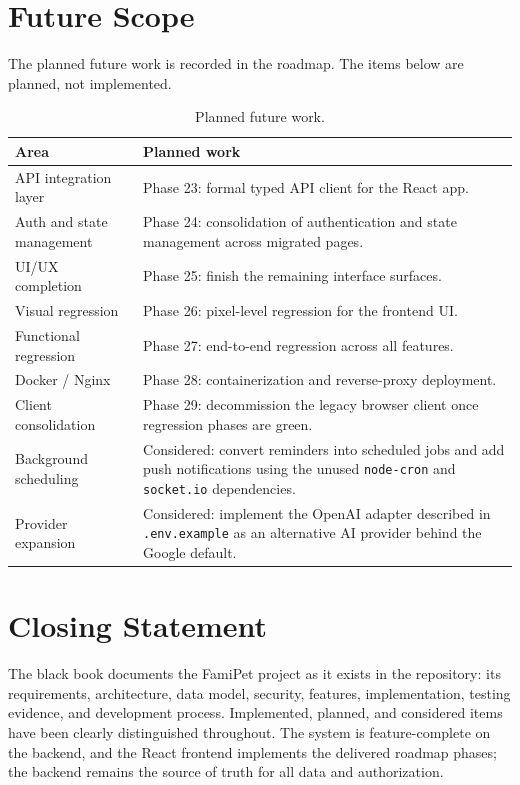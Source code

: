\section{Future Scope}

The planned future work is recorded in the roadmap. The items below are planned,
not implemented.

\begin{center}
\begin{longtable}{@{}p{5.2cm}p{9.4cm}@{}}
\caption{Planned future work.}
\label{tab:planned}\\
\toprule
\textbf{Area} & \textbf{Planned work} \\
\midrule
API integration layer & Phase 23: formal typed API client for the React app. \\
Auth and state management & Phase 24: consolidation of authentication and state
management across migrated pages. \\
UI/UX completion & Phase 25: finish the remaining interface surfaces. \\
Visual regression & Phase 26: pixel-level regression for the frontend UI. \\
Functional regression & Phase 27: end-to-end regression across all features. \\
Docker / Nginx & Phase 28: containerization and reverse-proxy deployment. \\
Client consolidation & Phase 29: decommission the legacy browser client once
regression phases are green. \\
Background scheduling & Considered: convert reminders into scheduled jobs and add
push notifications using the unused \texttt{node-cron} and \texttt{socket.io}
dependencies. \\
Provider expansion & Considered: implement the OpenAI adapter described in
\texttt{.env.example} as an alternative AI provider behind the Google default. \\
\bottomrule
\end{longtable}
\end{center}

\section{Closing Statement}

The black book documents the FamiPet project as it exists in the repository:
its requirements, architecture, data model, security, features, implementation,
testing evidence, and development process. Implemented, planned, and considered
items have been clearly distinguished throughout. The system is feature-complete
on the backend, and the React frontend implements the delivered roadmap phases;
the backend remains the source of truth for all
data and authorization.
